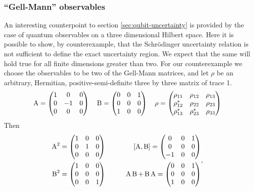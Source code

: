 \subsubsection{``Gell-Mann'' observables}
An interesting counterpoint to section \ref{sec:qubit-uncertainty} is provided by the case of quantum observables on a three dimensional Hilbert space. Here it is possible to show, by counterexample, that the Schr\"odinger uncertainty relation is not sufficient to define the exact uncertainty region. We expect that the same will hold true for all finite dimensions greater than two.
For our counterexample we choose the observables to be two of the Gell-Mann matrices, and let $\rho$ be an arbitrary, Hermitian, positive-semi-definite three by three matrix of trace 1.
\begin{equation}
  \label{eq:qutrit-observables-def}
  \operatorname{A} = \begin{pmatrix}
    1 & 0 & 0\\
    0 & -1 & 0\\
    0 & 0 & 0\\
  \end{pmatrix} \quad
  \operatorname{B} = \begin{pmatrix}
    0 & 0 & 1\\
    0 & 0 & 0\\
    1 & 0 & 0\\
  \end{pmatrix} \quad
  \rho =\begin{pmatrix}
    \rho_{11} & \rho_{12} & \rho_{13}\\
    \rho_{12}^* & \rho_{22} & \rho_{23}\\
    \rho_{13}^* & \rho_{23}^* & \rho_{33}
  \end{pmatrix}
\end{equation}
Then
\begin{equation}
  \begin{aligned}
    \operatorname{A}^2 &= \begin{pmatrix}
      1 & 0 & 0\\
      0 & 1 & 0\\
      0 & 0 & 0\\
    \end{pmatrix}\qquad
    &\left[\operatorname{A},\operatorname{B}\right] = \begin{pmatrix}
      0 & 0 & 1\\
      0 & 0 & 0\\
      -1 & 0 & 0\\
    \end{pmatrix}\\
    \operatorname{B}^2 &= \begin{pmatrix}
      1 & 0 & 0\\
      0 & 0 & 0\\
      0 & 0 & 1\\
    \end{pmatrix}
    &\operatorname{A} \operatorname{B} + \operatorname{B} \operatorname{A} = \begin{pmatrix}
      0 & 0 & 1\\
      0 & 0 & 0\\
      1 & 0 & 0\\
    \end{pmatrix}
  \end{aligned},
\end{equation}
